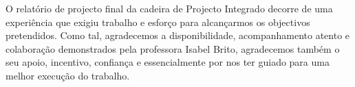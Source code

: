 \agradecimentos

O relatório de projecto final da cadeira de Projecto Integrado decorre de uma experiência que exigiu trabalho e esforço para alcançarmos os objectivos pretendidos. Como tal, agradecemos a disponibilidade, acompanhamento atento e
colaboração demonstrados pela professora Isabel Brito, agradecemos também o seu apoio, incentivo, confiança e essencialmente por nos ter guiado para uma melhor execução do trabalho.


